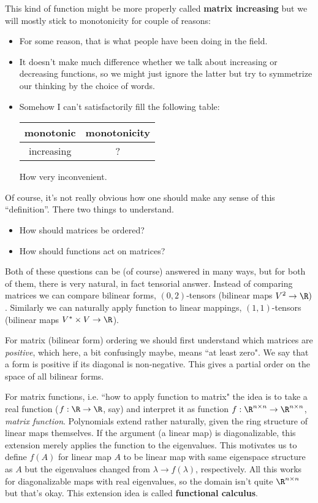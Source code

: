 This kind of function might be more properly called \textbf{matrix increasing} but we will mostly stick to monotonicity for couple of reasons:
\begin{itemize}
	\item For some reason, that is what people have been doing in the field.
	\item It doesn't make much difference whether we talk about increasing or decreasing functions, so we might just ignore the latter but try to symmetrize our thinking by the choice of words.
	\item Somehow I can't satisfactorily fill the following table:
	\begin{center}
	\begin{tabular}{| c | c |}
		\hline
		monotonic & monotonicity \\
		\hline
		increasing & ? \\
		\hline
	\end{tabular}
	\end{center}
	How very inconvenient.
\end{itemize}

Of course, it's not really obvious how one should make any sense of this ``definition''. There two things to understand.
\begin{itemize}
	\item How should matrices be ordered?
	\item How should functions act on matrices?
\end{itemize}
Both of these questions can be (of course) answered in many ways, but for both of them, there is very natural, in fact tensorial answer. Instead of comparing matrices we can compare bilinear forms, $(0, 2)$-tensors (bilinear maps $V^2 \to \R)$. Similarly we can naturally apply function to linear mappings, $(1, 1)$-tensors (bilinear maps $V^{*} \times V \to \R$).

For matrix (bilinear form) ordering we should first understand which matrices are \textit{positive}, which here, a bit confusingly maybe, means ``at least zero". We say that a form is positive if its diagonal is non-negative. This gives a partial order on the space of all bilinear forms.

For matrix functions, i.e. ``how to apply function to matrix" the idea is to take a real function ($f : \R \to \R$, say) and interpret it as function $f : \R^{n \times n} \to \R^{n \times n}$, \textit{matrix function}. Polynomials extend rather naturally, given the ring structure of linear maps themselves. If the argument (a linear map) is diagonalizable, this extension merely applies the function to the eigenvalues. This motivates us to define $f(A)$ for linear map $A$ to be linear map with same eigenspace structure as $A$ but the eigenvalues changed from $\lambda \to f(\lambda)$, respectively. All this works for diagonalizable maps with real eigenvalues, so the domain isn't quite $\R^{n \times n}$ but that's okay. This extension idea is called \textbf{functional calculus}.

